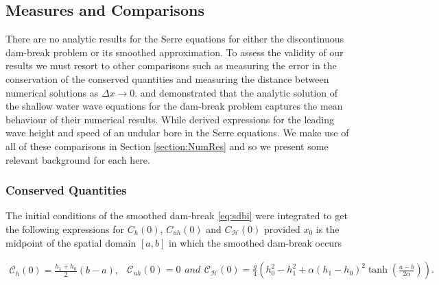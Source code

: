 \documentclass[times]{elsarticle}
\begin{document}
\subsection{Measures and Comparisons}
There are no analytic results for the Serre equations for either the discontinuous dam-break problem or its smoothed approximation. To assess the validity of our results we must resort to other comparisons such as measuring the error in the conservation of the conserved quantities and measuring the distance between numerical solutions as $\Delta x \rightarrow 0$. \citet{Hank-etal-2010-2034} and \citet{Mitsotakis-etal-2014} demonstrated that the analytic solution of the shallow water wave equations for the dam-break problem captures the mean behaviour of their numerical results. While \citet{El-etal-2006} derived expressions for the leading wave height and speed of an undular bore in the Serre equations. We make use of all of these comparisons in Section \ref{section:NumRes} and so we present some relevant background for each here. 


\subsubsection{Conserved Quantities}
The initial conditions of the smoothed dam-break \eqref{eq:sdbi} were integrated to get the following expressions for $C_{h}(0)$, $C_{uh}(0)$ and $C_{\mathcal{H}}(0)$ provided $x_0$ is the midpoint of the spatial domain $\left[a,b \right]$ in which the smoothed dam-break occurs
\begin{linenomath*}
	\begin{subequations}
	\begin{gather*}
	\mathcal{C}_{h}(0) = \frac{h_1 + h_0}{2}\left(b- a\right),
	\label{eq:Chdef}
	\end{gather*}
	\begin{gather*}
	\mathcal{C}_{uh}(0) = 0
	\label{eq:Cuhdef}
	\end{gather*}
		and
	\begin{gather*}
	\mathcal{C}_{\mathcal{H}}(0) = \frac{g}{4} \left(h_0^2 - h_1^2 + \alpha\left(h_1 - h_0\right)^2\tanh\left(\frac{a - b}{2 \alpha}\right)\right).
	\label{eq:CHdef}
	\end{gather*}
		\label{eq:Canalyticvalues}	
	\end{subequations}
\end{linenomath*}
\end{document}
